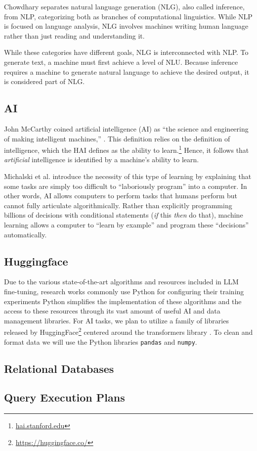Chowdhary separates natural language generation (NLG), also called inference, from NLP, categorizing both as branches of computational linguistics. While NLP is focused on language analysis, NLG involves machines writing human language rather than just reading and understanding it.

While these categories have different goals, NLG is interconnected with NLP. To generate text, a machine must first achieve a level of NLU. Because inference requires a machine to generate natural language to achieve the desired output, it is considered part of NLG.

\subsection{AI}
John McCarthy coined artificial intelligence (AI) as ``the science and engineering of making intelligent machines,'' \cite{andersen2002}. This definition relies on the definition of intelligence, which the HAI defines as the ability to learn.\footnote{\href{https://hai.stanford.edu/sites/default/files/2020-09/AI-Definitions-HAI.pdf}{hai.stanford.edu}} Hence, it follows that \textit{artificial} intelligence is identified by a machine's ability to learn.

Michalski et al. \cite{michalski2014} introduce the necessity of this type of learning by explaining that some tasks are simply too difficult to ``laboriously program'' into a computer. In other words, AI allows computers to perform tasks that humans perform but cannot fully articulate algorithmically. Rather than explicitly programming billions of decisions with conditional statements (\textit{if} this \textit{then} do that), machine learning allows a computer to ``learn by example'' and program these ``decisions'' automatically.

\subsection{Huggingface}
Due to the various state-of-the-art algorithms and resources included in LLM fine-tuning, research works commonly use Python for configuring their training experiments Python simplifies the implementation of these algorithms and the access to these resources through its vast amount of useful AI and data management libraries. For AI tasks, we plan to utilize a family of libraries released by HuggingFace\footnote{\url{https://huggingface.co/}} centered around the transformers library \cite{wolf2020}. To clean and format data we will use the Python libraries \lstinline{pandas} and \lstinline{numpy}.


\subsection{Relational Databases}

\subsection{Query Execution Plans}
